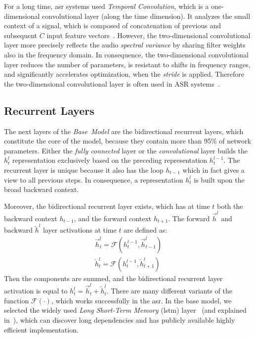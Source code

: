 For a long time, \acrshort{asr} systems used \textit{Temporal Convolution}, which is a one-dimensional
convolutional layer (along the time dimension).
It analyzes the small context of a signal,
which is composed of concatenation of previous and subsequent $C$ input feature vectors~\cite{dahl2011,ghoshal2013,hannun2014}.
However, the two-dimensional convolutional layer more precisely reflects the audio \textit{spectral variance}
by sharing filter weights also in the frequency domain.
In consequence, the two-dimensional convolutional layer reduces the number of parameters, is resistant to shifts
in frequency ranges, and significantly accelerates optimization, when the \textit{stride} is applied.
Therefore the two-dimensional convolutional layer is often used in ASR systems~\cite{abdel-hamid2012,sainath2013,soltau2014}.

\subsection*{Recurrent Layers}

The next layers of the \textit{Base~Model} are the bidirectional recurrent layers,
which constitute the core of the model, because they contain more than 95\% of network parameters.
Either the \textit{fully connected} layer or the \textit{convolutional} layer builds the $h^l_t$ representation
exclusively based on the preceding representation $h^{l-1}_t$.
The recurrent layer is unique because it also has the loop $h_{t-1}$ which in fact gives a view to all previous steps.
In consequence, a representation $h^l_t$ is built upon the broad backward context.

Moreover, the bidirectional recurrent layer exists, which has at time $t$ both the backward context $h_{t-1}$,
and the forward context $h_{t+1}$.
The forward $\overrightarrow{h}^l$ and backward $\overleftarrow{h}^l$ layer activations at time $t$ are defined as:
\begin{align}
\overrightarrow{h}^l_t = \mathcal{F}(h^{l-1}_t, \overrightarrow{h}^l_{t-1}) \\
\overleftarrow{h}^l_t = \mathcal{F}(h^{l-1}_t, \overleftarrow{h}^l_{t+1})
\end{align}
Then the components are summed, and the bidirectional recurrent layer activation is
equal to $h^l_t=\overrightarrow{h}^l_t + \overleftarrow{h}^l_t$.
There are many different variants of the function $\mathcal{F}(\cdot)$, which
works successfully in the \acrshort{asr}.
In the base model, we selected the widely used \textit{Long Short-Term Memory} (\acrshort{lstm})
layer~\cite{hochreiter1997} (and explained in~\cite{olah2015}),
which can discover long dependencies and has publicly available highly efficient implementation.

